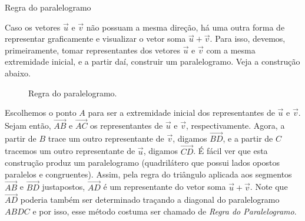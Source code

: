 \begin{observationtitle}{Regra do paralelogramo}

Caso os vetores \(\vec{u}\) e \(\vec{v}\) não possuam a mesma direção, há uma outra forma de representar graficamente e visualizar o vetor soma \(\vec{u}+\vec{v}\). Para isso, devemos, primeiramente, tomar representantes dos vetores \(\vec{u}\) e \(\vec{v}\) com a mesma extremidade inicial, e a partir daí, construir um paralelogramo. Veja a construção abaixo.
\begin{figure}[H]
\centering
{} 
 \caption{Regra do paralelogramo.} \label{fig-geometria-operacoesvetores-10} 
 \end{figure}
Escolhemos o ponto \(A\) para ser a extremidade inicial dos representantes de \(\vec{u}\) e \(\vec{v}\). Sejam então, \(\overrightarrow{AB}\) e \(\overrightarrow{AC}\) os representantes de \(\vec{u}\) e \(\vec{v}\), respectivamente. Agora, a partir de \(B\) trace um outro representante de \(\vec{v}\), digamos \(\overrightarrow{BD}\), e a partir de \(C\) tracemos um outro representante de \(\vec{u}\), digamos \(\overrightarrow{CD}\). É fácil ver que esta construção produz um paralelogramo (quadrilátero que possui lados opostos paralelos e congruentes). Assim, pela regra do triângulo aplicada aos segmentos \(\overrightarrow{AB}\) e \(\overrightarrow{BD}\) justapostos, \(\overrightarrow{AD}\) é um representante do vetor soma \(\vec{u}+\vec{v}\). Note que \(\overrightarrow{AD}\) poderia também ser determinado traçando a diagonal do paralelogramo \(ABDC\) e por isso, esse método costuma ser chamado de \textit{Regra do Paralelogramo}.
\end{observationtitle}

